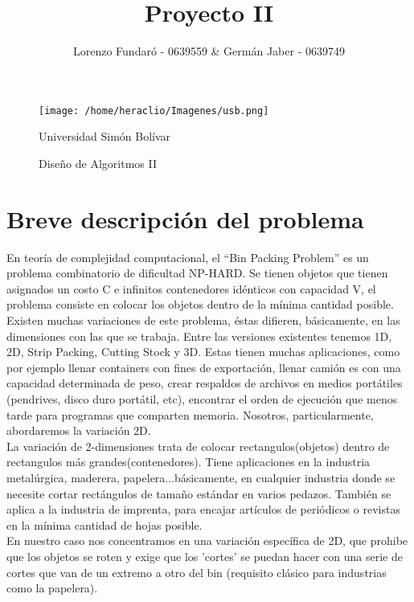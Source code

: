 \documentclass[a4paper,10pt]{article}
\title{Proyecto II}
\author{Lorenzo Fundar\'o - 0639559 & Germán Jaber - 0639749}
\begin{document}
\begin{figure}[t]
\begin{center}
\texttt{[image: /home/heraclio/Imagenes/usb.png]}
\end{center}
\begin{center}
\large Universidad Simón Bolívar
\end{center}
\begin{center}
 \large Diseño de Algoritmos II
\end{center}


\end{figure}


\maketitle

\thispagestyle{empty}
\newpage

\tableofcontents{}
\newpage

\section{Breve descripción del problema}

En teoría de complejidad computacional, el ``Bin Packing Problem'' es un problema combinatorio de dificultad NP-HARD. Se tienen objetos que
tienen asignados un costo C e infinitos contenedores idénticos con capacidad V, el problema consiste en colocar los objetos dentro de la
mínima cantidad posible.\\
\indent Existen muchas variaciones de este problema, éstas difieren, básicamente, en las dimensiones con las que se trabaja.
Entre las versiones existentes tenemos 1D, 2D, Strip Packing, Cutting Stock y 3D. Estas tienen muchas aplicaciones, como por ejemplo llenar
containers con fines de exportación, llenar camión es con una capacidad determinada de peso, crear respaldos de archivos en medios portátiles
(pendrives, disco duro portátil, etc), encontrar el orden de ejecución que menos tarde para programas que comparten memoria. Nosotros, 
particularmente, abordaremos la variación 2D.\\ 
\indent La variación de 2-dimensiones trata de colocar rectangulos(objetos) dentro de rectangulos más grandes(contenedores). Tiene aplicaciones en la 
industria metalúrgica, maderera, papelera...básicamente, en cualquier industria donde se necesite cortar rectángulos de tamaño estándar en varios pedazos.
También se aplica a la industria de imprenta, para encajar artículos de periódicos o revistas en la mínima cantidad de hojas posible.\\
\indent En nuestro caso nos concentramos en una variación específica de 2D, que prohibe que los objetos se roten y exige que los 'cortes' se puedan
hacer con una serie de cortes que van de un extremo a otro del bin (requisito clásico para industrias como la papelera).
\end{document}
